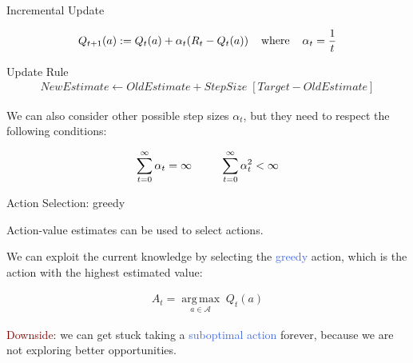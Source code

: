\documentclass{beamer}
\DeclareMathOperator*{\argmax}{arg\,max}
\begin{document}
\begin{frame}{Incremental Update}

\begin{align*}
	Q_{t+1}(a) := Q_t(a) + \alpha_t ( R_t - Q_t(a)) \hspace{4mm} \text{where} \hspace{4mm} \alpha_t = \frac{1}{t}
\end{align*}


\begin{block}{Update Rule}		
\begin{align*}
    NewEstimate \leftarrow OldEstimate + StepSize \; [Target - OldEstimate]
\end{align*}\end{block}


\vspace{4mm}

We can also consider other possible step sizes $\alpha_t$, but they need to respect the following conditions:

\begin{align*}
	\sum_{t=0}^{\infty} \alpha_t = \infty \hspace{9mm} \sum_{t=0}^{\infty} \alpha^2_t < \infty
\end{align*}

\end{frame}

\begin{frame}{Action Selection: greedy}

Action-value estimates can be used to select actions. 

\vspace{4mm}

We can exploit the current knowledge by selecting the \textcolor{RoyalBlue}{greedy} action, which is the action with the highest estimated value:


\begin{align*}
A_{t} =\underset{a \in \mathcal{A}}{\argmax} \; Q_t(a)
\end{align*}

\textcolor{Maroon}{Downside}: we can get stuck taking a \textcolor{RoyalBlue}{suboptimal action} forever, because we are not exploring better opportunities.

\end{frame}
\end{document}
